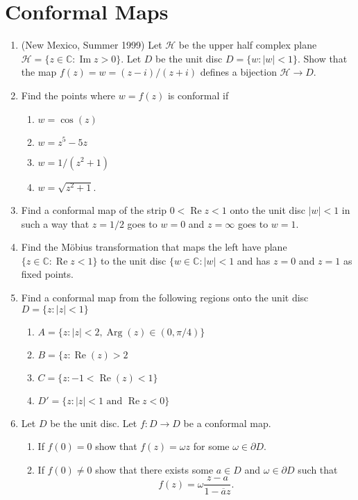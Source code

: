 \documentclass[a4paper,10pt]{article}
\newcommand{\CC}{\mathbb{C}}
\newcommand{\Arg}{\operatorname{Arg}}
\renewcommand{\Re}{\operatorname{Re}}
\renewcommand{\Im}{\operatorname{Im}}
\begin{document}
\section{Conformal Maps}
\begin{enumerate}
\item (New Mexico, Summer 1999)
Let $\mathcal{H}$ be the upper half complex plane $\mathcal{H} = \lbrace z \in \CC : \Im z > 0 \rbrace$.
Let $D$ be the unit disc $D = \lbrace w : \vert w \vert < 1 \rbrace$. 
Show that the map $f(z) = w = (z-i)/(z+i)$ defines a bijection $\mathcal{H} \to D$.
	
	
\item Find the points where $w = f(z)$ is conformal if 
\begin{enumerate}
	\item $w = \cos(z)$
	\item $w = z^5 - 5z$
	\item $w = 1/(z^2+1)$
	\item $w = \sqrt{z^2+1}$.
\end{enumerate}

\item Find a conformal map of the strip $0 < \Re z < 1$ onto the unit disc $\vert w \vert < 1$ in such a way that $z=1/2 $ goes to $ w=0$ and $z = \infty$ goes to $w=1$.

\item Find the M\"obius transformation that maps the left have plane $\lbrace z \in \CC: \Re z < 1 \rbrace$ to the unit disc $\lbrace w \in \CC : \vert w \vert < 1$ and has $z=0$ and $z=1$ as fixed points.

\item Find a conformal map from the following regions onto the unit disc $D = \lbrace z : \vert z \vert < 1 \rbrace$
\begin{enumerate}
	\item $A = \lbrace z: \vert z \vert < 2,  \Arg(z) \in (0,\pi/4) \rbrace $
	\item $B = \lbrace z: \Re(z) >2 $
	\item $C = \lbrace z: -1<\Re(z)<1 \rbrace$
	\item $D' = \lbrace z: \vert z \vert < 1 \mbox{ and } \Re z < 0\rbrace $ 
\end{enumerate}

\item Let $D$ be the unit disc. Let $f: D \to D$ be a conformal map. 
\begin{enumerate}
	\item If $f(0) = 0$ show that $f(z) = \omega z$ for some $\omega \in \partial D$. 
	\item If $f(0) \neq 0$ show that there exists some $a \in D$ and $\omega \in \partial D$ such that 
	$$ f(z) = \omega \frac{z - a}{1 - \overline{a} z}.$$
\end{enumerate}


\end{enumerate}
\end{document}

